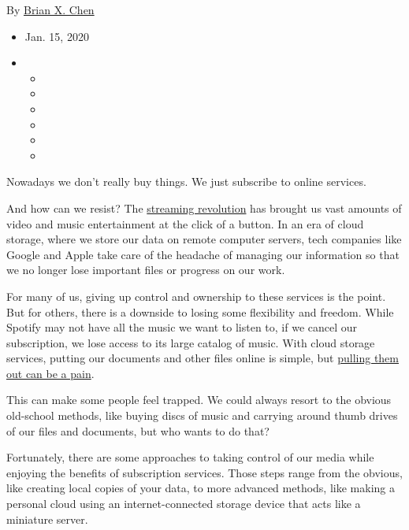 By \href{https://www.nytimes3xbfgragh.onion/by/brian-x-chen}{Brian X.
Chen}

\begin{itemize}
\item
  Jan. 15, 2020
\item
  \begin{itemize}
  \item
  \item
  \item
  \item
  \item
  \item
  \end{itemize}
\end{itemize}

Nowadays we don't really buy things. We just subscribe to online
services.

And how can we resist? The
\href{https://www.nytimes3xbfgragh.onion/2019/11/18/business/media/streaming-hollywood-revolution.html}{streaming
revolution} has brought us vast amounts of video and music entertainment
at the click of a button. In an era of cloud storage, where we store our
data on remote computer servers, tech companies like Google and Apple
take care of the headache of managing our information so that we no
longer lose important files or progress on our work.

For many of us, giving up control and ownership to these services is the
point. But for others, there is a downside to losing some flexibility
and freedom. While Spotify may not have all the music we want to listen
to, if we cancel our subscription, we lose access to its large catalog
of music. With cloud storage services, putting our documents and other
files online is simple, but
\href{https://www.nytimes3xbfgragh.onion/2017/01/25/technology/personaltech/dumping-a-bad-app-tips-for-a-painless-breakup.html}{pulling
them out can be a pain}.

This can make some people feel trapped. We could always resort to the
obvious old-school methods, like buying discs of music and carrying
around thumb drives of our files and documents, but who wants to do
that?

Fortunately, there are some approaches to taking control of our media
while enjoying the benefits of subscription services. Those steps range
from the obvious, like creating local copies of your data, to more
advanced methods, like making a personal cloud using an
internet-connected storage device that acts like a miniature server.

